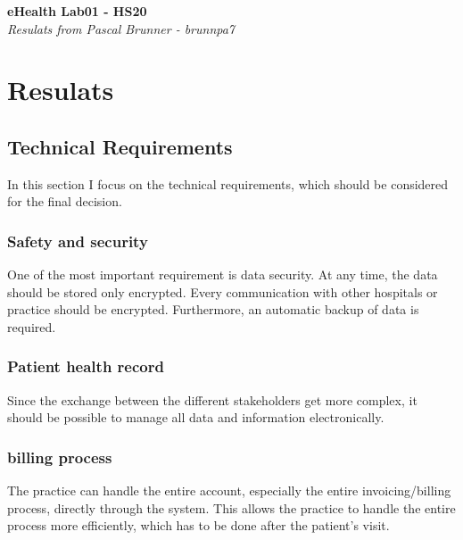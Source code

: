 \documentclass{report}
\newenvironment{Figure}
	{\par\medskip\noindent\minipage{\linewidth}}
	{\endminipage\par\medskip}
\begin{document}
\begin{titlepage}
   \begin{center}
      \Large\textbf{eHealth Lab01 - HS20}\\
      \large\textit{Resulats from Pascal Brunner - brunnpa7}
   \end{center}
\end{titlepage}


\chapter{Resulats}

\section{Technical Requirements}
In this section I focus on the technical requirements, which should be considered for the final decision. 

\subsection{Safety and security}
One of the most important requirement is data security. At any time, the data should be stored only encrypted. Every communication with other hospitals or practice should be encrypted. Furthermore, an automatic backup of data is required. 

\subsection{Patient health record}
Since the exchange between the different stakeholders get more complex, it should be possible to manage all data and information electronically. 

\subsection{billing process}
The practice can handle the entire account, especially the entire invoicing/billing process, directly through the system. This allows the practice to handle the entire process more efficiently, which has to be done after the patient’s visit.
\end{document}
